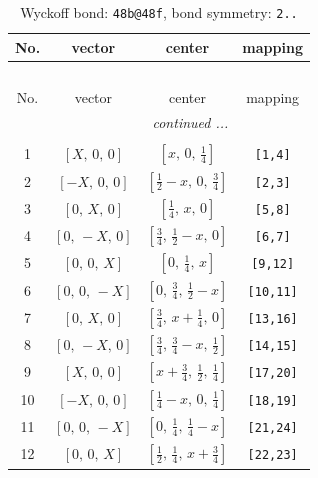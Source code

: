 \documentclass[fleqn,8pt]{jsarticle}
\begin{document}
\begin{longtable}{cccc}
\caption{Wyckoff bond: {\tt 48b@48f}, bond symmetry: {\tt 2..}}
 \\
 \hline \hline
No. & vector & center & mapping \\ \hline \endfirsthead

\multicolumn{3}{l}{\tablename\ \thetable{}} \\
 \hline \hline
No. & vector & center & mapping \\ \hline \endhead

 \hline \hline
\multicolumn{3}{r}{\footnotesize\it continued ...} \\ \endfoot

 \hline \hline
\multicolumn{3}{r}{} \\ \endlastfoot

1 & $\left[ X,\, 0,\, 0 \right]$ & $\left[ x,\, 0,\, \frac{1}{4} \right]$ & {\tt [1,4]} \\ \hline
2 & $\left[ - X,\, 0,\, 0 \right]$ & $\left[ \frac{1}{2} - x,\, 0,\, \frac{3}{4} \right]$ & {\tt [2,3]} \\ \hline
3 & $\left[ 0,\, X,\, 0 \right]$ & $\left[ \frac{1}{4},\, x,\, 0 \right]$ & {\tt [5,8]} \\ \hline
4 & $\left[ 0,\, - X,\, 0 \right]$ & $\left[ \frac{3}{4},\, \frac{1}{2} - x,\, 0 \right]$ & {\tt [6,7]} \\ \hline
5 & $\left[ 0,\, 0,\, X \right]$ & $\left[ 0,\, \frac{1}{4},\, x \right]$ & {\tt [9,12]} \\ \hline
6 & $\left[ 0,\, 0,\, - X \right]$ & $\left[ 0,\, \frac{3}{4},\, \frac{1}{2} - x \right]$ & {\tt [10,11]} \\ \hline
7 & $\left[ 0,\, X,\, 0 \right]$ & $\left[ \frac{3}{4},\, x + \frac{1}{4},\, 0 \right]$ & {\tt [13,16]} \\ \hline
8 & $\left[ 0,\, - X,\, 0 \right]$ & $\left[ \frac{3}{4},\, \frac{3}{4} - x,\, \frac{1}{2} \right]$ & {\tt [14,15]} \\ \hline
9 & $\left[ X,\, 0,\, 0 \right]$ & $\left[ x + \frac{3}{4},\, \frac{1}{2},\, \frac{1}{4} \right]$ & {\tt [17,20]} \\ \hline
10 & $\left[ - X,\, 0,\, 0 \right]$ & $\left[ \frac{1}{4} - x,\, 0,\, \frac{1}{4} \right]$ & {\tt [18,19]} \\ \hline
11 & $\left[ 0,\, 0,\, - X \right]$ & $\left[ 0,\, \frac{1}{4},\, \frac{1}{4} - x \right]$ & {\tt [21,24]} \\ \hline
12 & $\left[ 0,\, 0,\, X \right]$ & $\left[ \frac{1}{2},\, \frac{1}{4},\, x + \frac{3}{4} \right]$ & {\tt [22,23]} \\ \hline

\end{longtable}
\end{document}
